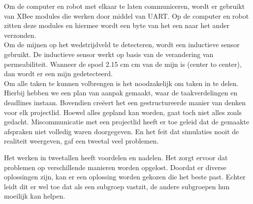 \documentclass{report}
\begin{document}
Om de computer en robot met elkaar te laten communiceren, wordt er gebruikt van XBee modules die werken door middel van UART. Op de computer en robot zitten deze modules en hiermee wordt een byte van het een naar het ander verzonden.
\\

Om de mijnen op het wedstrijdveld te detecteren, wordt een inductieve sensor gebruikt. De inductieve sensor werkt op basis van de verandering van permeabiliteit. Wanneer de spoel 2.15 cm  cm van de mijn is (center to center), dan wordt er een mijn gedetecteerd.\\

Om alle taken te kunnen volbrengen is het noodzakelijk om taken in te delen. Hierbij hebben we een plan van aanpak gemaakt, waar de taakverdelingen en deadlines instaan. Bovendien cre\"eert het een gestructureerde manier van denken voor elk projectlid.
Hoewel alles gepland kan worden, gaat toch niet alles zoals gedacht. Miscommunicatie met een projectlid heeft er toe geleid dat de gemaakte afspraken niet volledig waren doorgegeven. En het feit dat simulaties nooit de realiteit weergeven, gaf een tweetal veel problemen.

Het werken in tweetallen heeft voordelen en nadelen. Het zorgt ervoor dat problemen op verschillende manieren worden opgelost. Doordat er diverse oplossingen zijn, kan er een oplossing worden gekozen die het beste past. Echter leidt dit er wel toe dat als een subgroep vastzit, de andere subgroepen hun moeilijk kan helpen.  
\end{document}
